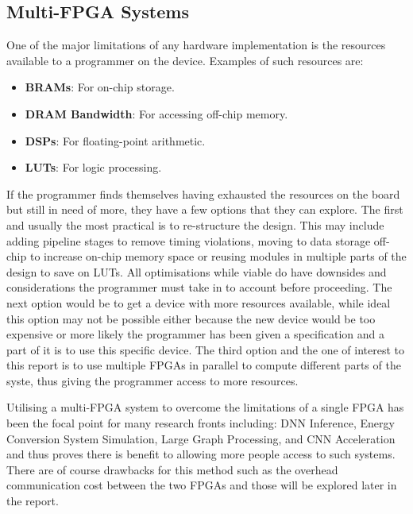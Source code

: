 \subsection{Multi-FPGA Systems}

One of the major limitations of any hardware implementation is the resources available to a programmer on the device. Examples of such resources are:

\begin{itemize}
    \item \textbf{BRAMs}: For on-chip storage.
    \item \textbf{DRAM Bandwidth}: For accessing off-chip memory.
    \item \textbf{DSPs}: For floating-point arithmetic.
    \item \textbf{LUTs}: For logic processing.
\end{itemize}

If the programmer finds themselves having exhausted the resources on the board but still in need of more, they have a few options that they can explore. The first and usually the most practical is to re-structure the design. This may include adding pipeline stages to remove timing violations, moving to data storage off-chip to increase on-chip memory space or reusing modules in multiple parts of the design to save on LUTs. All optimisations while viable do have downsides and considerations the programmer must take in to account before proceeding. The next option would be to get a device with more resources available, while ideal this option may not be possible either because the new device would be too expensive or more likely the programmer has been given a specification and a part of it is to use this specific device. The third option and the one of interest to this report is to use multiple FPGAs in parallel to compute different parts of the syste, thus giving the programmer access to more resources.

Utilising a multi-FPGA system to overcome the limitations of a single FPGA has been the focal point for many research fronts including: DNN Inference\cite{10.1145/3358192}, Energy Conversion System Simulation\cite{8822485}, Large Graph Processing\cite{10.1145/3020078.3021739}, and CNN Acceleration \cite{10.1145/3337821.3337846} and thus proves there is benefit to allowing more people access to such systems. There are of course drawbacks for this method such as the overhead communication cost between the two FPGAs and those will be explored later in the report.

